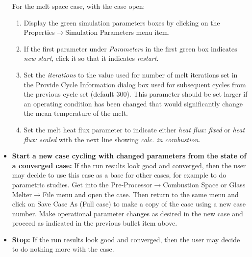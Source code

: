 \documentclass[12pt]{article}
\newcommand{\menu}[1]{\textsf{#1}}
\newcommand{\smenu}[2]{\textsf{#1$\to$#2}}
\newcommand{\ssmenu}[3]{\textsf{#1$\to$#2$\to$#3}}
\newcommand{\parm}[1]{\textit{#1}}
\newcommand{\dialog}[1]{\textsf{#1}}
\numberwithin{equation}{section}
\begin{document}
\begin{itemize}
For the melt space case, with the case open:
	\begin{enumerate}
	    \item Display the green simulation parameters boxes by clicking on the\\ \smenu{Properties}{Simulation Parameters} menu item.
	    \item If the first parameter under \parm{Parameters} in the first green box indicates \parm{new start}, click it so that it indicates \parm{restart}.
	    \item Set the \parm{iterations} to the value used for number of melt iterations set in the \dialog{Provide Cycle Information} dialog box used for subsequent cycles from the previous cycle set (default 300). This parameter should be set larger if an operating condition has been changed that would significantly change the mean temperature of the melt.
	    \item Set the melt heat flux parameter to indicate either \parm{heat flux: fixed} or \parm{heat flux: scaled} with the next line showing \parm{calc. in combustion}. 
	 \end{enumerate}

\item \textbf{Start a new case cycling with changed parameters from the state of a converged case:} If the run results look good and converged, then the user may decide to use this case as a base for other cases, for example to do parametric studies. Get into the \ssmenu{Pre-Processor}{Combustion Space or Glass Melter}{File} menu and open the case. Then return to the same menu and click on \menu{Save Case As (Full case)} to make a copy of the case using a new case number. Make operational parameter changes as desired in the new case and proceed as indicated in the previous bullet item above. 

\item \textbf{Stop:} If the run results look good and converged, then the user may decide to do nothing more with the case. 

\end{itemize}


\end{document}
